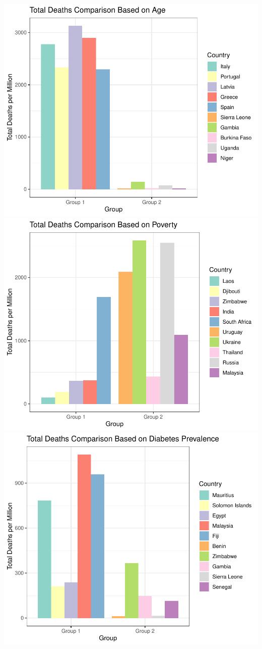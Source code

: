 \documentclass[11pt,preprint, authoryear]{elsarticle}
\numberwithin{equation}{section}
\numberwithin{figure}{section}
\numberwithin{table}{section}
\begin{document}
\includegraphics{Question-1_files/figure-latex/unnamed-chunk-3-1.pdf}
\newpage
\includegraphics{Question-1_files/figure-latex/unnamed-chunk-4-1.pdf}
\newpage
\includegraphics{Question-1_files/figure-latex/unnamed-chunk-5-1.pdf}
\end{document}

